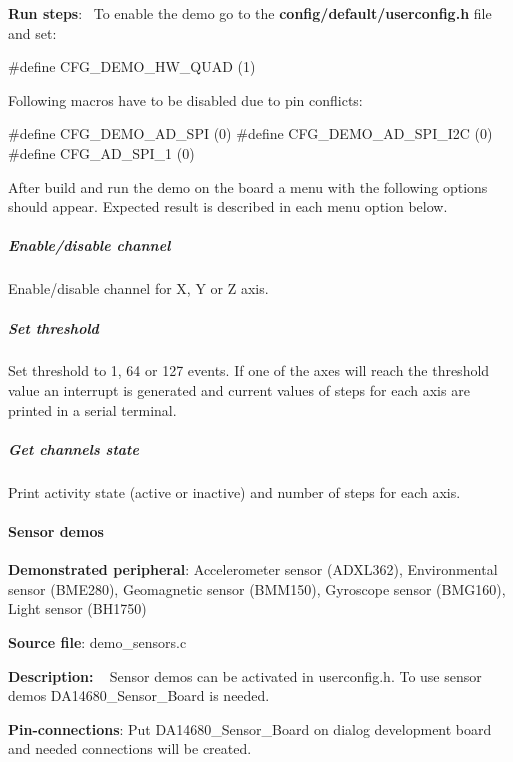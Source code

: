 \begin{DoxyItemize}
\item {\bfseries Run steps}\+:~\newline
 To enable the demo go to the {\bfseries {\ttfamily config/default/userconfig.\+h}} file and set\+: 
\begin{DoxyCode}
\textcolor{preprocessor}{#define CFG\_DEMO\_HW\_QUAD      (1)}
\end{DoxyCode}
 Following macros have to be disabled due to pin conflicts\+: 
\begin{DoxyCode}
\textcolor{preprocessor}{#define CFG\_DEMO\_AD\_SPI       (0)}
\textcolor{preprocessor}{#define CFG\_DEMO\_AD\_SPI\_I2C   (0)}
\textcolor{preprocessor}{#define CFG\_AD\_SPI\_1          (0)}
\end{DoxyCode}
 After build and run the demo on the board a menu with the following options should appear. Expected result is described in each menu option below.
\end{DoxyItemize}

\subparagraph*{Enable/disable channel}

Enable/disable channel for X, Y or Z axis.

\subparagraph*{Set threshold}

Set threshold to 1, 64 or 127 events. If one of the axes will reach the threshold value an interrupt is generated and current values of steps for each axis are printed in a serial terminal.

\subparagraph*{Get channels state}

Print activity state (active or inactive) and number of steps for each axis.

\paragraph*{Sensor demos}


\begin{DoxyItemize}
\item {\bfseries Demonstrated peripheral}\+: Accelerometer sensor (A\+D\+X\+L362), Environmental sensor (B\+M\+E280), Geomagnetic sensor (B\+M\+M150), Gyroscope sensor (B\+M\+G160), Light sensor (B\+H1750)
\item {\bfseries Source file}\+: demo\+\_\+sensors.\+c
\item {\bfseries Description\+:} ~\newline
 Sensor demos can be activated in userconfig.\+h. To use sensor demos {\ttfamily D\+A14680\+\_\+\+Sensor\+\_\+\+Board} is needed.
\item {\bfseries Pin-\/connections}\+: Put D\+A14680\+\_\+\+Sensor\+\_\+\+Board on dialog development board and needed connections will be created.
\end{DoxyItemize}

